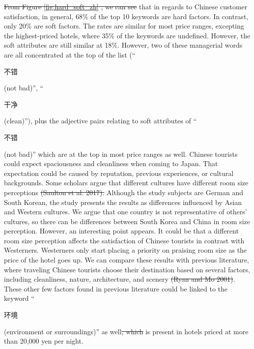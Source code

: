 \documentclass[smallextended,natbib]{svjour3}       %
\providecommand{\DIFadd}[1]{{\protect\color{blue}\uwave{#1}}} %
\providecommand{\DIFdel}[1]{{\protect\color{red}\sout{#1}}}                      %
\providecommand{\DIFaddbegin}{} %
\providecommand{\DIFaddend}{} %
\providecommand{\DIFdelbegin}{} %
\providecommand{\DIFdelend}{} %
\newcommand{\DIFscaledelfig}{0.5}
\newlength{\DIFdelgraphicswidth} %
\newlength{\DIFdelgraphicsheight} %
\newcommand{\DIFaddincludegraphics}[2][]{{\color{blue}\fbox{\DIFOincludegraphics[#1]{#2}}}} %
\newcommand{\DIFdelincludegraphics}[2][]{%
\sbox{\DIFdelgraphicsbox}{\DIFOincludegraphics[#1]{#2}}%
\settoboxwidth{\DIFdelgraphicswidth}{\DIFdelgraphicsbox} %
\settoboxtotalheight{\DIFdelgraphicsheight}{\DIFdelgraphicsbox} %
\scalebox{\DIFscaledelfig}{%
\parbox[b]{\DIFdelgraphicswidth}{\usebox{\DIFdelgraphicsbox}\\[-\baselineskip] \rule{\DIFdelgraphicswidth}{0em}}\llap{\resizebox{\DIFdelgraphicswidth}{\DIFdelgraphicsheight}{%
\setlength{\unitlength}{\DIFdelgraphicswidth}%
\begin{picture}(1,1)%
\thicklines\linethickness{2pt} %
{\color[rgb]{1,0,0}\put(0,0){\framebox(1,1){}}}%
{\color[rgb]{1,0,0}\put(0,0){\line( 1,1){1}}}%
{\color[rgb]{1,0,0}\put(0,1){\line(1,-1){1}}}%
\end{picture}%
}\hspace*{3pt}}} %
} %
\DeclareRobustCommand{\DIFaddbegin}{\DIFOaddbegin \let\includegraphics\DIFaddincludegraphics} %
\DeclareRobustCommand{\DIFaddend}{\DIFOaddend \let\includegraphics\DIFOincludegraphics} %
\DeclareRobustCommand{\DIFdelbegin}{\DIFOdelbegin \let\includegraphics\DIFdelincludegraphics} %
\DeclareRobustCommand{\DIFdelend}{\DIFOaddend \let\includegraphics\DIFOincludegraphics} %
\begin{document}
    \DIFdelbegin \DIFdel{From Figure \ref{fig:hard_soft_zh} , we can see }\DIFdelend \DIFaddbegin \DIFadd{Figure \ref{fig:hard_soft_zh} shows }\DIFaddend that in regards to Chinese customer satisfaction, in general, 68\% of the top 10 keywords are hard factors. In contrast, only 20\% are soft factors. The rates are similar for most price ranges, excepting the highest-priced hotels, where 35\% of the keywords are undefined. However, the soft attributes are still similar at 18\%. However, two of these managerial words are all concentrated at the top of the list (``\begin{CJK}{UTF8}{gbsn}不错\end{CJK} (not bad)'', ``\begin{CJK}{UTF8}{gbsn}干净\end{CJK} (clean)''), plus the adjective pairs relating to soft attributes of ``\begin{CJK}{UTF8}{gbsn}不错\end{CJK} (not bad)'' which are at the top in most price ranges as well. Chinese tourists could expect spaciousness and cleanliness when coming to Japan. That expectation could be caused by reputation, previous experiences, or cultural backgrounds. Some scholars argue that different cultures have different room size perceptions \DIFdelbegin \DIFdel{(Saulton et al. 2017). }\DIFdelend \DIFaddbegin \cite[][]{Saulton2017}\DIFadd{. }\DIFaddend Although the study subjects are German and South Korean, the study presents the results as differences influenced by Asian and Western cultures. We argue that one country is not representative of others’ cultures, so there can be differences between South Korea and China in room size perception. However, an interesting point appears. It could be that a different room size perception affects the satisfaction of Chinese tourists in contrast with Westerners. Westerners only start placing a priority on praising room size as the price of the hotel goes up. We can compare these results with previous literature, where traveling Chinese tourists choose their destination based on several factors, including cleanliness, nature, architecture, and scenery \DIFdelbegin \DIFdel{(Ryan and Mo 2001)}\DIFdelend \DIFaddbegin \cite[][]{ryan2001}\DIFaddend . These other few factors found in previous literature could be linked to the keyword ``\begin{CJK}{UTF8}{gbsn}环境\end{CJK} (environment or surroundings)'' as well\DIFdelbegin \DIFdel{, which }\DIFdelend \DIFaddbegin \DIFadd{. This keyword }\DIFaddend is present in hotels priced at more than 20,000 yen per night. 
\end{document}

